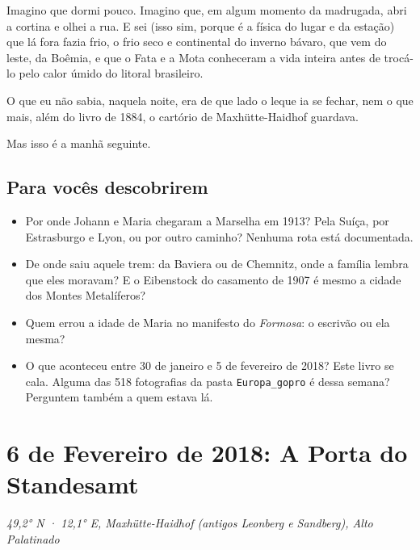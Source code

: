 \documentclass[
  brazilian,
  11pt,
  openany]{book}
\providecommand{\tightlist}{%
  \setlength{\itemsep}{0pt}\setlength{\parskip}{0pt}}
\begin{document}
Imagino que dormi pouco. Imagino que, em algum momento da madrugada,
abri a cortina e olhei a rua. E sei (isso sim, porque é a física do
lugar e da estação) que lá fora fazia frio, o frio seco e continental do
inverno bávaro, que vem do leste, da Boêmia, e que o Fata e a Mota
conheceram a vida inteira antes de trocá-lo pelo calor úmido do litoral
brasileiro.

O que eu não sabia, naquela noite, era de que lado o leque ia se fechar,
nem o que mais, além do livro de 1884, o cartório de Maxhütte-Haidhof
guardava.

Mas isso é a manhã seguinte.

\section{Para vocês descobrirem}\label{para-vocuxeas-descobrirem-15}

\begin{itemize}
\tightlist
\item
  Por onde Johann e Maria chegaram a Marselha em 1913? Pela Suíça, por
  Estrasburgo e Lyon, ou por outro caminho? Nenhuma rota está
  documentada.
\item
  De onde saiu aquele trem: da Baviera ou de Chemnitz, onde a família
  lembra que eles moravam? E o Eibenstock do casamento de 1907 é mesmo a
  cidade dos Montes Metalíferos?
\item
  Quem errou a idade de Maria no manifesto do \emph{Formosa}: o escrivão
  ou ela mesma?
\item
  O que aconteceu entre 30 de janeiro e 5 de fevereiro de 2018? Este
  livro se cala. Alguma das 518 fotografias da pasta
  \texttt{Europa\_gopro} é dessa semana? Perguntem também a quem estava
  lá.
\end{itemize}

\chapter{6 de Fevereiro de 2018: A Porta do Standesamt}\label{cap-17}

\emph{49,2° N · 12,1° E, Maxhütte-Haidhof (antigos Leonberg e Sandberg),
Alto Palatinado}
\end{document}
